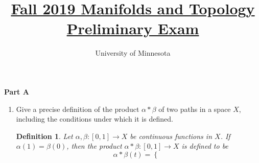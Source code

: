 \documentclass{article}
\title{\href{https://math.umn.edu/sites/math.umn.edu/files/exams/mantopf19.pdf}{Fall 2019 Manifolds and Topology Preliminary Exam}}
\author{University of Minnesota}
\date{}
\newtheorem*{definition}{Definition}
\begin{document}
\maketitle

\textbf{Part A}
\begin{enumerate}
	\item Give a precise definition of the product $\alpha * \beta$ of two paths in a space $X$, including the conditions under which it is defined.
	
	\begin{definition}
	Let $\alpha, \beta: [0,1] \rightarrow X$ be continuous functions in $X$. If $\alpha (1) = \beta(0)$, then the product
	$\alpha * \beta: [0,1] \rightarrow X$ is defined to be 
	\[ \alpha * \beta (t) = \begin{cases} \end{cases}\]
	\end{definition}
	
\end{enumerate}
\end{document}
